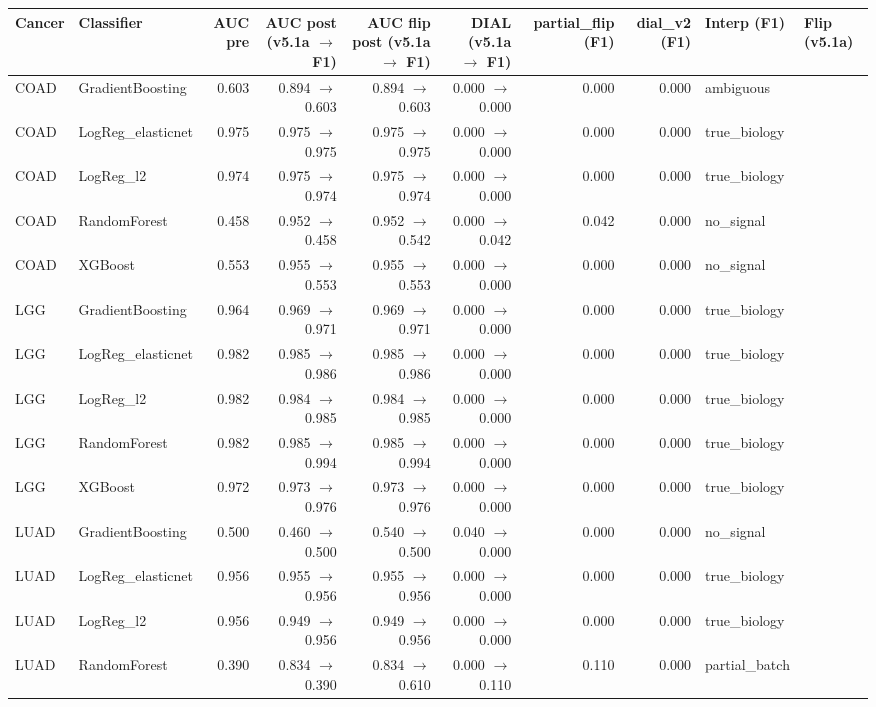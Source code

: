 \documentclass[11pt,a4paper]{article}
\begin{document}
\begin{tabular}{llrrrrrrll}\toprule
Cancer & Classifier & AUC pre & AUC post (v5.1a $\to$ F1) & AUC flip post (v5.1a $\to$ F1) & DIAL (v5.1a $\to$ F1) & partial\_flip (F1) & dial\_v2 (F1) & Interp (F1) & Flip (v5.1a) \\ \midrule
COAD & GradientBoosting & 0.603 & 0.894 $\to$ 0.603 & 0.894 $\to$ 0.603 & 0.000 $\to$ 0.000 & 0.000 & 0.000 & ambiguous &  \\
COAD & LogReg\_elasticnet & 0.975 & 0.975 $\to$ 0.975 & 0.975 $\to$ 0.975 & 0.000 $\to$ 0.000 & 0.000 & 0.000 & true\_biology &  \\
COAD & LogReg\_l2 & 0.974 & 0.975 $\to$ 0.974 & 0.975 $\to$ 0.974 & 0.000 $\to$ 0.000 & 0.000 & 0.000 & true\_biology &  \\
COAD & RandomForest & 0.458 & 0.952 $\to$ 0.458 & 0.952 $\to$ 0.542 & 0.000 $\to$ 0.042 & 0.042 & 0.000 & no\_signal &  \\
COAD & XGBoost & 0.553 & 0.955 $\to$ 0.553 & 0.955 $\to$ 0.553 & 0.000 $\to$ 0.000 & 0.000 & 0.000 & no\_signal &  \\
LGG & GradientBoosting & 0.964 & 0.969 $\to$ 0.971 & 0.969 $\to$ 0.971 & 0.000 $\to$ 0.000 & 0.000 & 0.000 & true\_biology &  \\
LGG & LogReg\_elasticnet & 0.982 & 0.985 $\to$ 0.986 & 0.985 $\to$ 0.986 & 0.000 $\to$ 0.000 & 0.000 & 0.000 & true\_biology &  \\
LGG & LogReg\_l2 & 0.982 & 0.984 $\to$ 0.985 & 0.984 $\to$ 0.985 & 0.000 $\to$ 0.000 & 0.000 & 0.000 & true\_biology &  \\
LGG & RandomForest & 0.982 & 0.985 $\to$ 0.994 & 0.985 $\to$ 0.994 & 0.000 $\to$ 0.000 & 0.000 & 0.000 & true\_biology &  \\
LGG & XGBoost & 0.972 & 0.973 $\to$ 0.976 & 0.973 $\to$ 0.976 & 0.000 $\to$ 0.000 & 0.000 & 0.000 & true\_biology &  \\
LUAD & GradientBoosting & 0.500 & 0.460 $\to$ 0.500 & 0.540 $\to$ 0.500 & 0.040 $\to$ 0.000 & 0.000 & 0.000 & no\_signal &  \\
LUAD & LogReg\_elasticnet & 0.956 & 0.955 $\to$ 0.956 & 0.955 $\to$ 0.956 & 0.000 $\to$ 0.000 & 0.000 & 0.000 & true\_biology &  \\
LUAD & LogReg\_l2 & 0.956 & 0.949 $\to$ 0.956 & 0.949 $\to$ 0.956 & 0.000 $\to$ 0.000 & 0.000 & 0.000 & true\_biology &  \\
LUAD & RandomForest & 0.390 & 0.834 $\to$ 0.390 & 0.834 $\to$ 0.610 & 0.000 $\to$ 0.110 & 0.110 & 0.000 & partial\_batch &  \\

\end{tabular}
\end{document}
